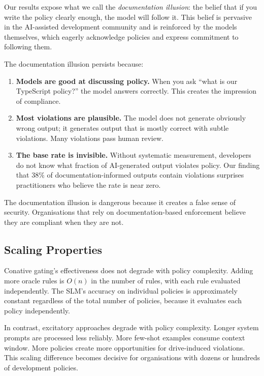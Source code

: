 \documentclass[11pt,a4paper]{article}
\begin{document}
Our results expose what we call the \emph{documentation illusion}:
the belief that if you write the policy clearly enough, the model
will follow it.  This belief is pervasive in the AI-assisted
development community and is reinforced by the models themselves,
which eagerly acknowledge policies and express commitment to
following them.

The documentation illusion persists because:

\begin{enumerate}
  \item \textbf{Models are good at discussing policy.}  When you
        ask ``what is our TypeScript policy?'' the model answers
        correctly.  This creates the impression of compliance.
  \item \textbf{Most violations are plausible.}  The model does not
        generate obviously wrong output; it generates output that
        is mostly correct with subtle violations.  Many violations
        pass human review.
  \item \textbf{The base rate is invisible.}  Without systematic
        measurement, developers do not know what fraction of
        AI-generated output violates policy.  Our finding that
        38\% of documentation-informed outputs contain violations
        surprises practitioners who believe the rate is near zero.
\end{enumerate}

The documentation illusion is dangerous because it creates a false
sense of security.  Organisations that rely on documentation-based
enforcement believe they are compliant when they are not.

\subsection{Scaling Properties}

Conative gating's effectiveness does not degrade with policy
complexity.  Adding more oracle rules is $O(n)$ in the number of
rules, with each rule evaluated independently.  The SLM's accuracy
on individual policies is approximately constant regardless of the
total number of policies, because it evaluates each policy
independently.

In contrast, excitatory approaches degrade with policy complexity.
Longer system prompts are processed less reliably.  More few-shot
examples consume context window.  More policies create more
opportunities for drive-induced violations.  This scaling difference
becomes decisive for organisations with dozens or hundreds of
development policies.
\end{document}
